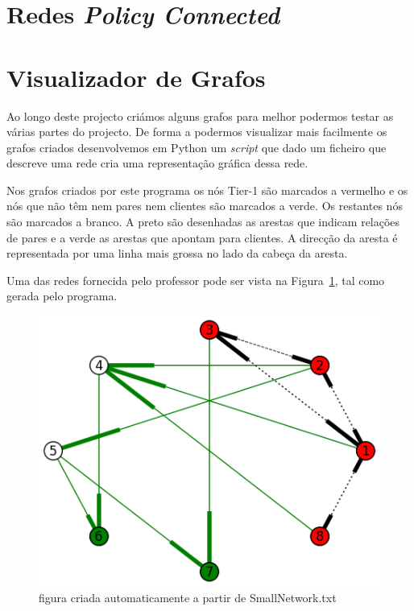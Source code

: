 \documentclass[10pt,a4paper]{article}
\begin{document}
\section{Redes \textit{Policy Connected}}

\section{Visualizador de Grafos}
Ao longo deste projecto criámos alguns grafos para melhor podermos testar as várias partes do projecto. De forma a podermos visualizar mais facilmente os grafos criados desenvolvemos em Python um \textit{script} que dado um ficheiro que descreve uma rede cria uma representação gráfica dessa rede.

Nos grafos criados por este programa os nós Tier-1 são marcados a vermelho e os nós que não têm nem pares nem clientes são marcados a verde. Os restantes nós são marcados a branco. A preto são desenhadas as arestas que indicam relações de pares e a verde as arestas que apontam para clientes. A direcção da aresta é representada por uma linha mais grossa no lado da cabeça da aresta.

Uma das redes fornecida pelo professor pode ser vista na Figura~\ref{fig:SmallNetwork}, tal como gerada pelo programa.


\begin{figure}[h]
\centering
\includegraphics[scale=0.6]{SmallNetwork}
\caption{figura criada automaticamente a partir de SmallNetwork.txt}
\label{fig:SmallNetwork}
\end{figure}
\end{document}
